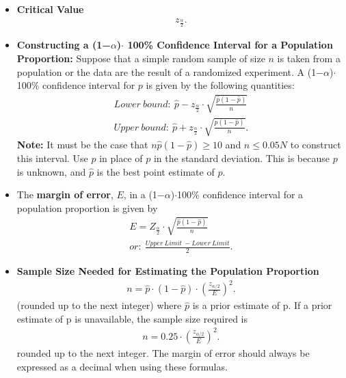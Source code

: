 \documentclass{report}
\begin{document}
\begin{itemize}
        \item \textbf{Critical Value}
            \begin{align*}
                z_{ \frac{\alpha}{2}}
            .\end{align*}

        \item  \textbf{Constructing a (1−$\alpha $)$\cdot$ 100\% Confidence Interval for a Population Proportion:}
            Suppose that a simple random sample of size $n $ is taken from a population or the data are the result of a randomized experiment. A (1−$\alpha $)$\cdot  $100\% confidence interval for $p $ is given by the following quantities:
          \begin{align*}
              Lower\ bound:\ \hat{p} - z_{\frac{\alpha}{2}} \cdot \sqrt{\frac{\hat{p}(1 - \hat{p})}{n}}  \\
              Upper\ bound:\ \hat{p} + z_{\frac{\alpha}{2}} \cdot \sqrt{\frac{\hat{p}(1 - \hat{p})}{n}}
          .\end{align*}
          \textbf{Note:} It must be the case that $n\hat{p}(1-\hat{p})\geq 10$ and $n \leq 0.05N$ to construct this interval. Use $\hat{p}$ in place of $p$ in the standard deviation. This is because $p$ is unknown, and $\hat{p}$ is the best point estimate of $p$.
          \item The \textbf{margin of error}, $E $, in a (1−$\alpha $)$\cdot  $100\% confidence interval for a population proportion is given by
          \begin{align*}
              E = Z_{\frac{\alpha}{2}} \cdot \sqrt{\frac{\hat{p}(1-\hat{p})}{n}} \\
              or:\ \frac{Upper\ Limit\ - Lower\ Limit}{2}
          .\end{align*}
      \item \textbf{Sample Size Needed for Estimating the Population Proportion}
          \begin{align*}
              n = \hat{p} \cdot (1 - \hat{p}) \cdot \left(\frac{z_{\alpha/2}}{E}\right)^2 
          .\end{align*}
          (rounded up to the next integer) where $\hat{p}$ is a prior estimate of p.
          \bigbreak \noindent 
          If a prior estimate of p is unavailable, the sample size required is
          \begin{align*}
              n = 0.25 \cdot \left(\frac{z_{\alpha/2}}{E}\right)^2
          .\end{align*}
          rounded up to the next integer. The margin of error should always be expressed as a decimal when using these formulas.

\end{itemize}
\end{document}
